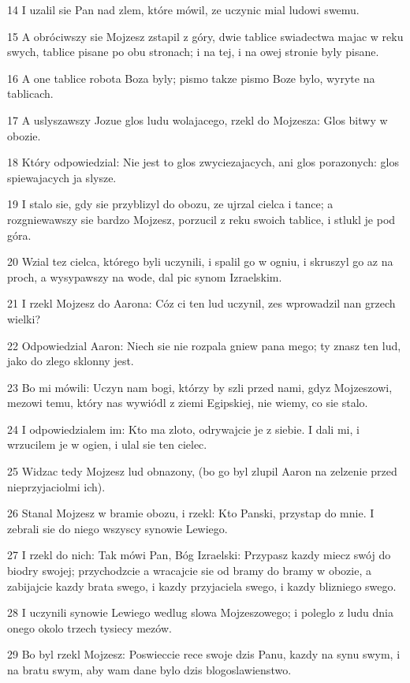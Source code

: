 \par 14 I uzalil sie Pan nad zlem, które mówil, ze uczynic mial ludowi swemu.
\par 15 A obróciwszy sie Mojzesz zstapil z góry, dwie tablice swiadectwa majac w reku swych, tablice pisane po obu stronach; i na tej, i na owej stronie byly pisane.
\par 16 A one tablice robota Boza byly; pismo takze pismo Boze bylo, wyryte na tablicach.
\par 17 A uslyszawszy Jozue glos ludu wolajacego, rzekl do Mojzesza: Glos bitwy w obozie.
\par 18 Który odpowiedzial: Nie jest to glos zwyciezajacych, ani glos porazonych: glos spiewajacych ja slysze.
\par 19 I stalo sie, gdy sie przyblizyl do obozu, ze ujrzal cielca i tance; a rozgniewawszy sie bardzo Mojzesz, porzucil z reku swoich tablice, i stlukl je pod góra.
\par 20 Wzial tez cielca, którego byli uczynili, i spalil go w ogniu, i skruszyl go az na proch, a wysypawszy na wode, dal pic synom Izraelskim.
\par 21 I rzekl Mojzesz do Aarona: Cóz ci ten lud uczynil, zes wprowadzil nan grzech wielki?
\par 22 Odpowiedzial Aaron: Niech sie nie rozpala gniew pana mego; ty znasz ten lud, jako do zlego sklonny jest.
\par 23 Bo mi mówili: Uczyn nam bogi, którzy by szli przed nami, gdyz Mojzeszowi, mezowi temu, który nas wywiódl z ziemi Egipskiej, nie wiemy, co sie stalo.
\par 24 I odpowiedzialem im: Kto ma zloto, odrywajcie je z siebie. I dali mi, i wrzucilem je w ogien, i ulal sie ten cielec.
\par 25 Widzac tedy Mojzesz lud obnazony, (bo go byl zlupil Aaron na zelzenie przed nieprzyjaciolmi ich).
\par 26 Stanal Mojzesz w bramie obozu, i rzekl: Kto Panski, przystap do mnie. I zebrali sie do niego wszyscy synowie Lewiego.
\par 27 I rzekl do nich: Tak mówi Pan, Bóg Izraelski: Przypasz kazdy miecz swój do biodry swojej; przychodzcie a wracajcie sie od bramy do bramy w obozie, a zabijajcie kazdy brata swego, i kazdy przyjaciela swego, i kazdy blizniego swego.
\par 28 I uczynili synowie Lewiego wedlug slowa Mojzeszowego; i poleglo z ludu dnia onego okolo trzech tysiecy mezów.
\par 29 Bo byl rzekl Mojzesz: Poswieccie rece swoje dzis Panu, kazdy na synu swym, i na bratu swym, aby wam dane bylo dzis blogoslawienstwo.
